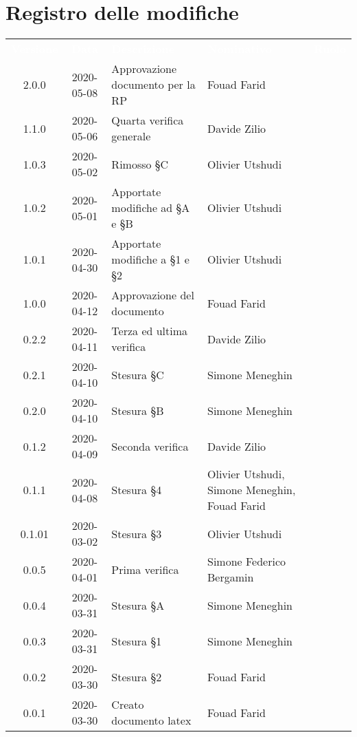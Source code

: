 \section*{Registro delle modifiche}
{
	\centering
	\begin{longtable}{ c c  C{4cm}  C{3.5cm}  C{3.5cm} }
		\textcolor{white}{\textbf{Versione}} & \textcolor{white}{\textbf{Data}} & \textcolor{white}{\textbf{Descrizione}} & \textcolor{white}{\textbf{Nominativo}} & \textcolor{white}{\textbf{Ruolo}}\\	
		2.0.0 & 2020-05-08 & Approvazione documento per la RP & Fouad Farid &\RdP \\
		1.1.0 & 2020-05-06 & Quarta verifica generale & Davide Zilio & \ver{}\\
		1.0.3 & 2020-05-02 & Rimosso §C & Olivier Utshudi &\prog \\		
		1.0.2 & 2020-05-01 & Apportate modifiche ad §A e §B & Olivier Utshudi &\prog \\
		1.0.1 & 2020-04-30 & Apportate modifiche a §1 e §2 & Olivier Utshudi &\prog \\
		1.0.0 & 2020-04-12 & Approvazione del documento & Fouad Farid &\RdP{} \\
		0.2.2 & 2020-04-11 & Terza ed ultima verifica & Davide Zilio &\ver{} \\
		0.2.1 & 2020-04-10 & Stesura \S C & Simone Meneghin &\prog{} \\
		0.2.0 & 2020-04-10 & Stesura \S B & Simone Meneghin &\prog{} \\
		0.1.2 & 2020-04-09 & Seconda verifica & Davide Zilio &\ver{} \\
		0.1.1 & 2020-04-08 & Stesura \S 4 & Olivier Utshudi, Simone Meneghin, Fouad Farid &\prog{} \\
		0.1.01 & 2020-03-02 & Stesura \S 3 & Olivier Utshudi &\prog{} \\
		0.0.5 & 2020-04-01 & Prima verifica & Simone Federico Bergamin &\ver{} \\
		0.0.4 & 2020-03-31 & Stesura \S A & Simone Meneghin &\prog{} \\
		0.0.3 & 2020-03-31 & Stesura \S 1 & Simone Meneghin &\prog{} \\
		0.0.2 & 2020-03-30 & Stesura \S 2 & Fouad Farid &\prog{} \\
		0.0.1 & 2020-03-30 & Creato documento latex & Fouad Farid &\prog{}\\		
		
	\end{longtable}

}